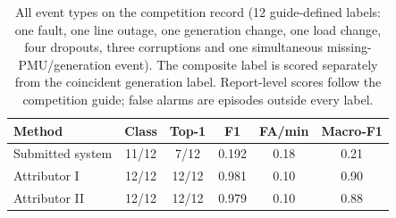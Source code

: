 \begin{table}[t]\centering\footnotesize
\caption{All event types on the competition record (12 guide-defined labels: one fault, one line outage, one generation change, one load change, four dropouts, three corruptions and one simultaneous missing-PMU/generation event). The composite label is scored separately from the coincident generation label. Report-level scores follow the competition guide; false alarms are episodes outside every label.}
\label{tab:allevents-raw}\setlength{\tabcolsep}{3.2pt}
\begin{tabular}{lccccc}\toprule
Method & Class & Top-1 & F1 & FA/min & Macro-F1 \\
\midrule
Submitted system & 11/12 & 7/12 & 0.192 & 0.18 & 0.21 \\
Attributor I & 12/12 & 12/12 & 0.981 & 0.10 & 0.90 \\
Attributor II & 12/12 & 12/12 & 0.979 & 0.10 & 0.88 \\
\bottomrule\end{tabular}\end{table}
